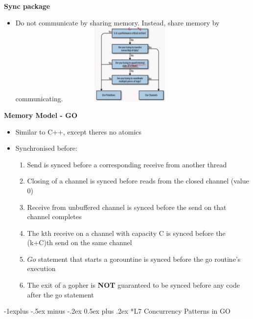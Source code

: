 \documentclass[10pt, landscape]{article}
\makeatletter
\renewcommand{\subsection}{\@startsection{subsection}{2}{0mm}%
                                {-1explus -.5ex minus -.2ex}%
                                {0.5ex plus .2ex}%
                                {\normalfont\normalsize\bfseries}}
\makeatother
\begin{document}
\begin{multicols}{4}
\textbf{Sync package} \\
\begin{itemize}
    \item Do not communicate by sharing memory. Instead, share memory by communicating.
    \includegraphics*[width=7cm, height =4cm]{syncpackage.png}
\end{itemize}

\textbf{Memory Model - GO} \\
\begin{itemize}
    \item Similar to C++, except theres no atomics
    \item Synchronised before:
    \begin{enumerate}
        \item Send is synced before a corresponding receive from another thread 
        \item Closing of a channel is synced before reads from the closed channel (value 0)
        \item Receive from unbuffered channel is synced before the send on that channel completes
        \item The kth receive on a channel with capacity C is synced before the (k+C)th send on the same channel
        \item $Go$ statement that starts a gorountine is synced before the go routine's execution 
        \item The exit of a gopher is \textbf{NOT} guaranteed to be synced before any code after the go statement
    \end{enumerate}
\end{itemize}

\subsection*{L7 Concurrency Patterns in GO}


\end{multicols}
\end{document}
